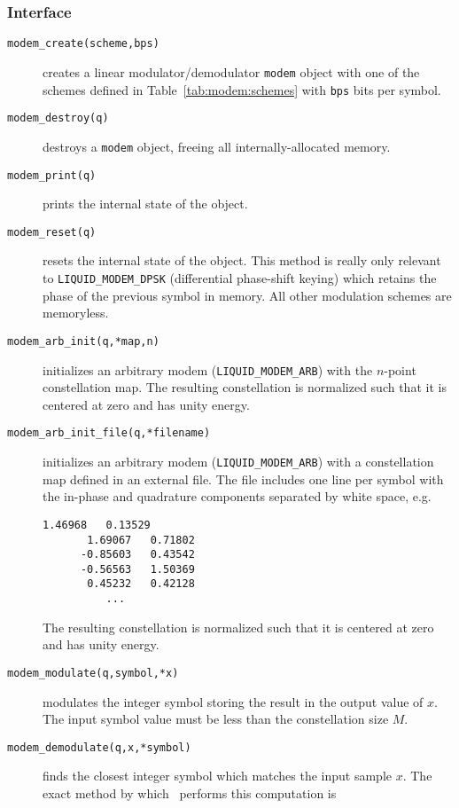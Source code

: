\subsubsection{Interface}
\label{module:modem:digital:interface}
\begin{description}
\item[{\tt modem\_create(scheme,bps)}]
    creates a linear modulator/demodulator {\tt modem} object with one
    of the schemes defined in Table~\ref{tab:modem:schemes}
    with {\tt bps} bits per symbol.
\item[{\tt modem\_destroy(q)}]
    destroys a {\tt modem} object, freeing all internally-allocated
    memory.
\item[{\tt modem\_print(q)}]
    prints the internal state of the object.
\item[{\tt modem\_reset(q)}]
    resets the internal state of the object.
    This method is really only relevant to {\tt LIQUID\_MODEM\_DPSK}
    (differential phase-shift keying) which retains the phase of the
    previous symbol in memory.
    All other modulation schemes are memoryless.
\item[{\tt modem\_arb\_init(q,*map,n)}]
    initializes an arbitrary modem ({\tt LIQUID\_MODEM\_ARB}) with the $n$-point
    constellation map.
    The resulting constellation is normalized such that it is centered
    at zero and has unity energy.
\item[{\tt modem\_arb\_init\_file(q,*filename)}]
    initializes an arbitrary modem ({\tt LIQUID\_MODEM\_ARB}) with a constellation
    map defined in an external file.
    The file includes one line per symbol with the in-phase and
    quadrature components separated by white space, e.g.
    \begin{Verbatim}[fontsize=\small]
       1.46968   0.13529
       1.69067   0.71802
      -0.85603   0.43542
      -0.56563   1.50369
       0.45232   0.42128
          ...
    \end{Verbatim}
    The resulting constellation is normalized such that it is centered
    at zero and has unity energy.
\item[{\tt modem\_modulate(q,symbol,*x)}]
    modulates the integer symbol storing the result in the output value
    of $x$.
    The input symbol value must be less than the constellation size $M$.
\item[{\tt modem\_demodulate(q,x,*symbol)}]
    finds the closest integer symbol which matches the input sample $x$.
    The exact method by which \liquid\ performs this computation is

\end{description}
